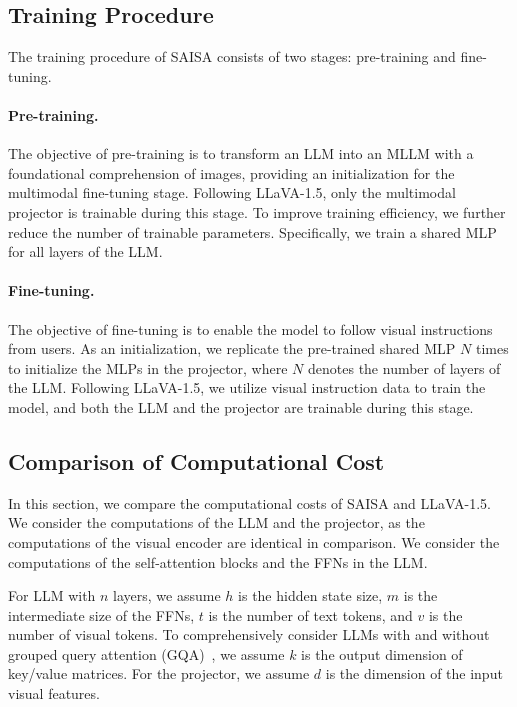 \subsection{Training Procedure}
The training procedure of SAISA consists of two stages: pre-training and fine-tuning.

\vspace{-0.35cm}
\paragraph{Pre-training.}
The objective of pre-training is to transform an LLM into an MLLM with a foundational comprehension of images, providing an initialization for the multimodal fine-tuning stage.
Following LLaVA-1.5, only the multimodal projector is trainable during this stage.
To improve training efficiency, we further reduce the number of trainable parameters.
Specifically, we train a shared MLP for all layers of the LLM.

\vspace{-0.35cm}
\paragraph{Fine-tuning.}
The objective of fine-tuning is to enable the model to follow visual instructions from users.
As an initialization, we replicate the pre-trained shared MLP $N$ times to initialize the MLPs in the projector, where $N$ denotes the number of layers of the LLM.
Following LLaVA-1.5, we utilize visual instruction data to train the model, and both the LLM and the projector are trainable during this stage.




\subsection{Comparison of Computational Cost}
In this section, we compare the computational costs of SAISA and LLaVA-1.5.
We consider the computations of the LLM and the projector, as the computations of the visual encoder are identical in comparison.
We consider the computations of the self-attention blocks and the FFNs in the LLM.

For LLM with $n$ layers, we assume $h$ is the hidden state size, $m$ is the intermediate size of the FFNs, $t$ is the number of text tokens, and $v$ is the number of visual tokens.
To comprehensively consider LLMs with and without grouped query attention (GQA)~\cite{ainslie2023gqatraininggeneralizedmultiquery}, we assume $k$ is the output dimension of key/value matrices.
For the projector, we assume $d$ is the dimension of the input visual features.

